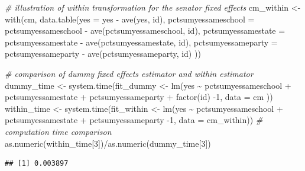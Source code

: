 \documentclass[
  12pt,
]{style/krantz}
\newenvironment{Shaded}{\begin{snugshade}}{\end{snugshade}}
\newcommand{\AttributeTok}[1]{\textcolor[rgb]{0.77,0.63,0.00}{#1}}
\newcommand{\CommentTok}[1]{\textcolor[rgb]{0.56,0.35,0.01}{\textit{#1}}}
\newcommand{\DecValTok}[1]{\textcolor[rgb]{0.00,0.00,0.81}{#1}}
\newcommand{\FunctionTok}[1]{\textcolor[rgb]{0.00,0.00,0.00}{#1}}
\newcommand{\NormalTok}[1]{#1}
\newcommand{\OtherTok}[1]{\textcolor[rgb]{0.56,0.35,0.01}{#1}}
\newcommand{\SpecialCharTok}[1]{\textcolor[rgb]{0.00,0.00,0.00}{#1}}
\begin{document}
\begin{Shaded}
\begin{Highlighting}[]
\CommentTok{\# illustration of within transformation for the senator fixed effects}
\NormalTok{cm\_within }\OtherTok{\textless{}{-}} 
  \FunctionTok{with}\NormalTok{(cm, }\FunctionTok{data.table}\NormalTok{(}\AttributeTok{yes =}\NormalTok{ yes }\SpecialCharTok{{-}} \FunctionTok{ave}\NormalTok{(yes, id),}
                      \AttributeTok{pctsumyessameschool =}\NormalTok{ pctsumyessameschool }\SpecialCharTok{{-}} \FunctionTok{ave}\NormalTok{(pctsumyessameschool, id),}
                      \AttributeTok{pctsumyessamestate =}\NormalTok{ pctsumyessamestate }\SpecialCharTok{{-}} \FunctionTok{ave}\NormalTok{(pctsumyessamestate, id),}
                      \AttributeTok{pctsumyessameparty =}\NormalTok{ pctsumyessameparty }\SpecialCharTok{{-}} \FunctionTok{ave}\NormalTok{(pctsumyessameparty, id)}
\NormalTok{                      ))}

\CommentTok{\# comparison of dummy fixed effects estimator and within estimator}
\NormalTok{dummy\_time }\OtherTok{\textless{}{-}} \FunctionTok{system.time}\NormalTok{(fit\_dummy }\OtherTok{\textless{}{-}} 
              \FunctionTok{lm}\NormalTok{(yes }\SpecialCharTok{\textasciitilde{}}\NormalTok{ pctsumyessameschool }\SpecialCharTok{+} 
\NormalTok{                           pctsumyessamestate }\SpecialCharTok{+}\NormalTok{ pctsumyessameparty }\SpecialCharTok{+} \FunctionTok{factor}\NormalTok{(id) }\SpecialCharTok{{-}}\DecValTok{1}\NormalTok{, }\AttributeTok{data =}\NormalTok{ cm}
\NormalTok{                         ))}
\NormalTok{within\_time }\OtherTok{\textless{}{-}} \FunctionTok{system.time}\NormalTok{(fit\_within }\OtherTok{\textless{}{-}} 
                             \FunctionTok{lm}\NormalTok{(yes }\SpecialCharTok{\textasciitilde{}}\NormalTok{ pctsumyessameschool }\SpecialCharTok{+} 
\NormalTok{                           pctsumyessamestate }\SpecialCharTok{+}\NormalTok{ pctsumyessameparty }\SpecialCharTok{{-}}\DecValTok{1}\NormalTok{, }\AttributeTok{data =}\NormalTok{ cm\_within))}
\CommentTok{\# computation time comparison}
\FunctionTok{as.numeric}\NormalTok{(within\_time[}\DecValTok{3}\NormalTok{])}\SpecialCharTok{/}\FunctionTok{as.numeric}\NormalTok{(dummy\_time[}\DecValTok{3}\NormalTok{])}
\end{Highlighting}
\end{Shaded}

\begin{verbatim}
## [1] 0.003897
\end{verbatim}
\end{document}
